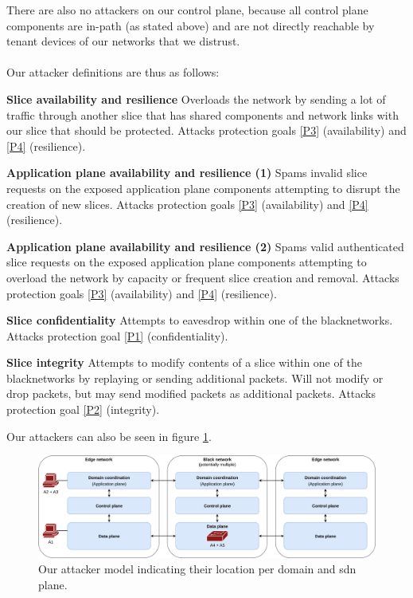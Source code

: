 There are also no attackers on our control plane, because all control plane components are in-path (as stated above) and are not directly reachable by tenant devices of our networks that we distrust.

\paragraph{} Our attacker definitions are thus as follows:
\begin{description}[style=multiline, labelwidth=0.7cm]
    \item[\namedlabel{A1}{A1}] \textbf{Slice availability and resilience} Overloads the network by sending a lot of traffic through another slice that has shared components and network links with our slice that should be protected. Attacks protection goals \ref{P3} (availability) and \ref{P4} (resilience).
    \item[\namedlabel{A2}{A2}] \textbf{Application plane availability and resilience (1)} Spams invalid slice requests on the exposed application plane components attempting to disrupt the creation of new slices. Attacks protection goals \ref{P3} (availability) and \ref{P4} (resilience).
    \item[\namedlabel{A3}{A3}] \textbf{Application plane availability and resilience (2)} Spams valid authenticated slice requests on the exposed application plane components attempting to overload the network by capacity or frequent slice creation and removal. Attacks protection goals \ref{P3} (availability) and \ref{P4} (resilience).
    \item[\namedlabel{A4}{A4}] \textbf{Slice confidentiality} Attempts to eavesdrop within one of the \gls{blacknetwork}s. Attacks protection goal \ref{P1} (confidentiality).
    \item[\namedlabel{A5}{A5}] \textbf{Slice integrity} Attempts to modify contents of a slice within one of the \gls{blacknetwork}s by replaying or sending additional packets. Will not modify or drop packets, but may send modified packets as additional packets. Attacks protection goal \ref{P2} (integrity).
\end{description}

Our attackers can also be seen in figure \ref{fig:attacker_model}.

\begin{landscape}
    \begin{figure}[h]
        \centering
        \includegraphics[width=\linewidth]{images/chapter_4/attacker_model.png}
        \caption[Attacker model]{Our attacker model indicating their location per domain and \acrshort{sdn} plane.}
        \label{fig:attacker_model}
    \end{figure}
\end{landscape}